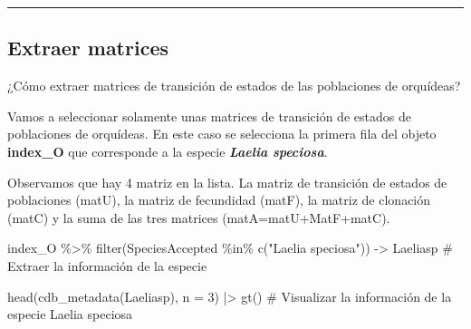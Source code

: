 \documentclass[
  12pt,
  letterpaper,
]{book}
\newenvironment{Shaded}{\begin{snugshade}}{\end{snugshade}}
\newcommand{\AttributeTok}[1]{\textcolor[rgb]{0.40,0.45,0.13}{#1}}
\newcommand{\CommentTok}[1]{\textcolor[rgb]{0.37,0.37,0.37}{#1}}
\newcommand{\DecValTok}[1]{\textcolor[rgb]{0.68,0.00,0.00}{#1}}
\newcommand{\FunctionTok}[1]{\textcolor[rgb]{0.28,0.35,0.67}{#1}}
\newcommand{\NormalTok}[1]{\textcolor[rgb]{0.00,0.23,0.31}{#1}}
\newcommand{\OtherTok}[1]{\textcolor[rgb]{0.00,0.23,0.31}{#1}}
\newcommand{\SpecialCharTok}[1]{\textcolor[rgb]{0.37,0.37,0.37}{#1}}
\newcommand{\StringTok}[1]{\textcolor[rgb]{0.13,0.47,0.30}{#1}}
\begin{document}
\begin{table}
\begin{tabular*}{\linewidth}{@{\extracolsep{\fill}}rlllllllllllllllllllrllrrrrllllrrrrllllllllrlrrlrllllrrlll}
\bottomrule
\end{tabular*}
\end{table}

\begin{center}\rule{0.5\linewidth}{0.5pt}\end{center}

\subsection{Extraer matrices}\label{extraer-matrices}

¿Cómo extraer matrices de transición de estados de las poblaciones de
orquídeas?

Vamos a seleccionar solamente unas matrices de transición de estados de
poblaciones de orquídeas. En este caso se selecciona la primera fila del
objeto \textbf{index\_O} que corresponde a la especie
\textbf{\emph{Laelia speciosa}}.

Observamos que hay 4 matriz en la lista. La matriz de transición de
estados de poblaciones (matU), la matriz de fecundidad (matF), la matriz
de clonación (matC) y la suma de las tres matrices
(matA=matU+MatF+matC).

\begin{Shaded}
\begin{Highlighting}[]
\NormalTok{index\_O }\SpecialCharTok{\%\textgreater{}\%} \FunctionTok{filter}\NormalTok{(SpeciesAccepted }\SpecialCharTok{\%in\%} \FunctionTok{c}\NormalTok{(}\StringTok{"Laelia speciosa"}\NormalTok{)) }\OtherTok{{-}\textgreater{}}\NormalTok{ Laeliasp }\CommentTok{\# Extraer la información de la especie }

\FunctionTok{head}\NormalTok{(}\FunctionTok{cdb\_metadata}\NormalTok{(Laeliasp), }\AttributeTok{n =} \DecValTok{3}\NormalTok{) }\SpecialCharTok{|\textgreater{}} 
  \FunctionTok{gt}\NormalTok{()  }\CommentTok{\# Visualizar la información de la especie Laelia speciosa}
\end{Highlighting}
\end{Shaded}
\end{document}
